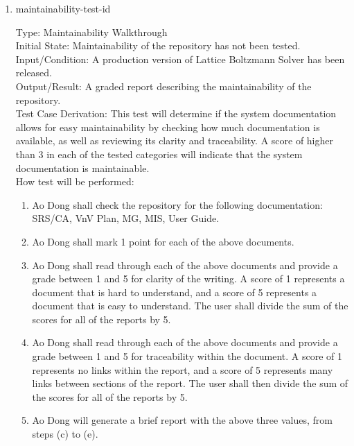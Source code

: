 \documentclass[12pt, titlepage]{article}
\newcommand{\famname}{Lattice Boltzmann Solver}
\newcounter{testcounter} %
\begin{document}
\begin{enumerate}

\item{maintainability-test-id\thetestcounter \\}

Type: Maintainability Walkthrough\\
					
Initial State: Maintainability of the repository has not been tested.\\
					
Input/Condition: A production version of {\famname} has been released.\\
					
Output/Result: A graded report describing the maintainability of the repository.\\

Test Case Derivation: This test will determine if the system documentation allows for easy maintainability by checking how much documentation is available, as well as reviewing its clarity and traceability. A score of higher than 3 in each of the tested categories will indicate that the system documentation is maintainable.\\ 
					
How test will be performed: 

\begin{enumerate}
\item Ao Dong shall check the repository for the following documentation: SRS/CA, VnV Plan, MG, MIS, User Guide.
\item Ao Dong shall mark 1 point for each of the above documents.
\item Ao Dong shall read through each of the above documents and provide a grade between 1 and 5 for clarity of the writing. A score of 1 represents a document that is hard to understand, and a score of 5 represents a document that is easy to understand. The user shall divide the sum of the scores for all of the reports by 5.
\item Ao Dong shall read through each of the above documents and provide a grade between 1 and 5 for traceability within the document. A score of 1 represents no links within the report, and a score of 5 represents many links between sections of the report. The user shall then divide the sum of the scores for all of the reports by 5.
\item Ao Dong will generate a brief report with the above three values, from steps (c) to (e).\\
\end{enumerate}

\end{enumerate}
\end{document}
